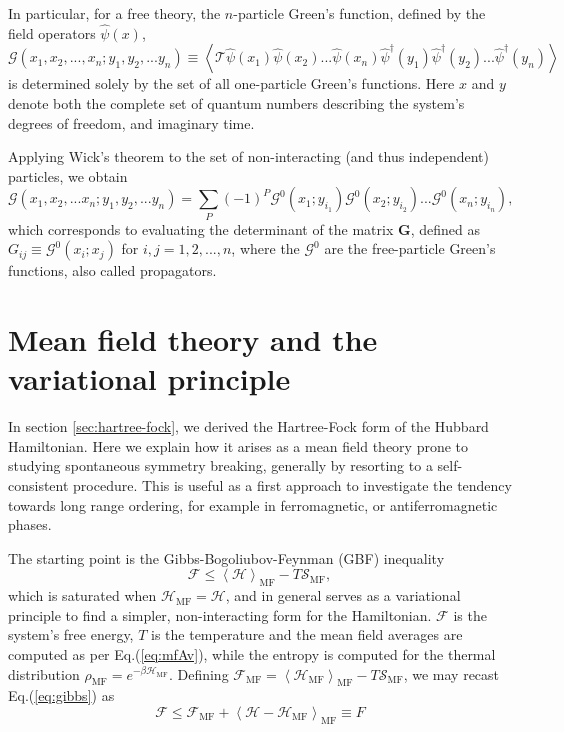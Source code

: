 In particular, for a free theory, the $n$-particle Green's function, defined by the field operators $\hat{\psi} ( x )$,
\begin{equation}
\mathcal{G} ( x_1, x_2, ..., x_n; y_1, y_2, ... y_n ) \equiv \left\langle \mathcal{T} \hat{\psi} ( x_1 ) \hat{\psi} ( x_2 ) ... \hat{\psi} ( x_n ) \hat{\psi}^\dagger ( y_1 ) \hat{\psi}^\dagger ( y_2 ) ... \hat{\psi}^\dagger ( y_n ) \right\rangle
\end{equation}
is determined solely by the set of all one-particle Green's functions.
Here $x$ and $y$ denote both the complete set of quantum numbers describing the system's degrees of freedom, and imaginary time.

Applying Wick's theorem to the set of non-interacting (and thus independent) particles, we obtain
\begin{equation}
\mathcal{G} ( x_1, x_2, ... x_n; y_1, y_2,... y_n ) = \sum_P (- 1 )^P \mathcal{G}^0 ( x_1; y_{i_1} ) \mathcal{G}^0 ( x_2; y_{i_2} ) ... \mathcal{G}^0 ( x_n; y_{i_n} ) ,
\end{equation}
which corresponds to evaluating the determinant of the matrix $\bm G$, defined as $G_{ij} \equiv \mathcal{G}^0 ( x_i ; x_j )$ for $i, j = 1, 2, ..., n$, where the $\mathcal{G}^0$ are the free-particle Green's functions, also called propagators.

\section{Mean field theory and the variational principle}
\label{sec:mftVariational}

In section \ref{sec:hartree-fock}, we derived the Hartree-Fock form of the Hubbard Hamiltonian.
Here we explain how it arises as a mean field theory prone to studying spontaneous symmetry breaking, generally by resorting to a self-consistent procedure.
This is useful as a first approach to investigate the tendency towards long range ordering, for example in ferromagnetic, or antiferromagnetic phases.

The starting point is the Gibbs-Bogoliubov-Feynman (GBF) inequality
\begin{equation}\label{eq:gibbs}
\mathcal{F} \le \left\langle \mathcal{H} \right\rangle_{\text{MF}} - T \mathcal{S}_{\text{MF}} ,
\end{equation}
which is saturated when $\mathcal{H}_{\text{MF}} = \mathcal{H}$, and in general  serves as a variational principle to find a simpler, non-interacting form for the Hamiltonian.
$\mathcal{F}$ is the system's free energy, $T$ is the temperature and the mean field averages are computed as per Eq.(\ref{eq:mfAv}), while the entropy is computed for the thermal distribution $\rho_{\text{MF}} = e^{-\beta \mathcal{H}_{\text{MF}}}$.
Defining $\mathcal{F}_{\text{MF}} = \left\langle \mathcal{H}_{\text{MF}} \right\rangle_{\text{MF}} - T \mathcal{S}_{\text{MF}}$, we may recast Eq.(\ref{eq:gibbs}) as
\begin{equation}\label{eq:gibbs2}
\mathcal{F} \le \mathcal{F}_{\text{MF}} + \left\langle \mathcal{H} - \mathcal{H}_{\text{MF}} \right\rangle_{\text{MF}} \equiv F
\end{equation}

